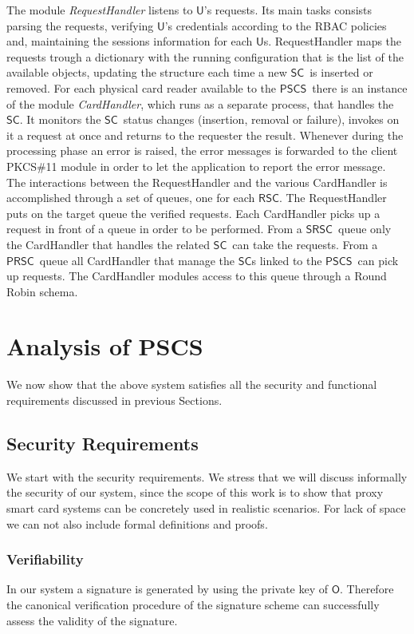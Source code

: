 \documentclass{sig-alternate}
\newcommand{\Owner}{\ensuremath{\mathsf{O}}}
\newcommand{\User}{\ensuremath{\mathsf{U}}}
\newcommand{\SC}{\ensuremath{\mathsf{SC}}}
\newcommand{\RSC}{\ensuremath{\mathsf{RSC}}}
\newcommand{\SRSC}{\ensuremath{\mathsf{SRSC}}}
\newcommand{\PRSC}{\ensuremath{\mathsf{PRSC}}}
\newcommand{\PSCS}{\ensuremath{\mathsf{PSCS}}}
\begin{document}
The module \emph{RequestHandler} listens to \User 's requests.  Its
main tasks consists parsing the requests, verifying \User 's
credentials according to the RBAC policies and, maintaining the
sessions information for each \User s. RequestHandler maps the requests trough a
dictionary with the running configuration that is the list of the
available objects, updating the structure each time a new \SC\ is
inserted or removed.  For each physical card reader available to the \PSCS\ there is an
instance of the module \emph{CardHandler}, which runs as a separate
process, that handles the \SC . It monitors the \SC\ status changes (insertion,
removal or failure), invokes on it a request at once and returns to the requester the result.
Whenever during the processing phase an error is
raised, the error messages is forwarded to the client
PKCS\#11 module in order to let the application to report the error message.  The interactions between the RequestHandler and the various CardHandler is accomplished through a set of queues, one for each \RSC . The RequestHandler puts on the target queue the verified requests. Each CardHandler picks up a request in front of a queue in order to be performed. From a \SRSC\ queue only the CardHandler that handles the related \SC\ can take the requests. From a \PRSC\ queue all CardHandler that manage the \SC s linked to the \PSCS\ can pick up requests. The CardHandler modules access to this queue through a Round Robin schema.



\section{Analysis of PSCS}

We now show that the above system satisfies all the security and functional requirements discussed in previous Sections.

\subsection{Security Requirements}
We start with the security requirements. We stress that we will discuss informally the security of our system, since the scope of this work
is to show that proxy smart card systems can be concretely used in realistic scenarios. For lack of space we can not also include formal definitions and proofs.

\subsubsection{Verifiability}  In our system a signature is generated by using the private key of \Owner. Therefore the canonical verification procedure of the
signature scheme can successfully assess the validity of the signature.
\end{document}
